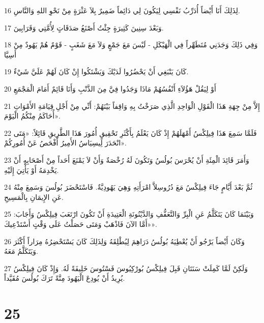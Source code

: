 \par 16 لِذَلِكَ أَنَا أَيْضاً أُدَرِّبُ نَفْسِي لِيَكُونَ لِي دَائِماً ضَمِيرٌ بِلاَ عَثْرَةٍ مِنْ نَحْوِ اللهِ وَالنَّاسِ.
\par 17 وَبَعْدَ سِنِينَ كَثِيرَةٍ جِئْتُ أَصْنَعُ صَدَقَاتٍ لِأُمَّتِي وَقَرَابِينَ.
\par 18 وَفِي ذَلِكَ وَجَدَنِي مُتَطَهِّراً فِي الْهَيْكَلِ - لَيْسَ مَعَ جَمْعٍ وَلاَ مَعَ شَغَبٍ - قَوْمٌ هُمْ يَهُودٌ مِنْ أَسِيَّا
\par 19 كَانَ يَنْبَغِي أَنْ يَحْضُرُوا لَدَيْكَ وَيَشْتَكُوا إِنْ كَانَ لَهُمْ عَلَيَّ شَيْءٌ.
\par 20 أَوْ لِيَقُلْ هَؤُلاَءِ أَنْفُسُهُمْ مَاذَا وَجَدُوا فِيَّ مِنَ الذَّنْبِ وَأَنَا قَائِمٌ أَمَامَ الْمَجْمَعِ
\par 21 إِلاَّ مِنْ جِهَةِ هَذَا الْقَوْلِ الْوَاحِدِ الَّذِي صَرَخْتُ بِهِ وَاقِفاً بَيْنَهُمْ: أَنِّي مِنْ أَجْلِ قِيَامَةِ الأَمْوَاتِ أُحَاكَمُ مِنْكُمُ الْيَوْمَ».
\par 22 فَلَمَّا سَمِعَ هَذَا فِيلِكْسُ أَمْهَلَهُمْ إِذْ كَانَ يَعْلَمُ بِأَكْثَرِ تَحْقِيقٍ أُمُورَ هَذَا الطَّرِيقِ قَائِلاً: «مَتَى انْحَدَرَ لِيسِيَاسُ الأَمِيرُ أَفْحَصُ عَنْ أُمُورِكُمْ».
\par 23 وَأَمَرَ قَائِدَ الْمِئَةِ أَنْ يُحْرَسَ بُولُسُ وَتَكُونَ لَهُ رُخْصَةٌ وَأَنْ لاَ يَمْنَعَ أَحَداً مِنْ أَصْحَابِهِ أَنْ يَخْدِمَهُ أَوْ يَأْتِيَ إِلَيْهِ.
\par 24 ثُمَّ بَعْدَ أَيَّامٍ جَاءَ فِيلِكْسُ مَعَ دُرُوسِلاَّ امْرَأَتِهِ وَهِيَ يَهُودِيَّةٌ. فَاسْتَحْضَرَ بُولُسَ وَسَمِعَ مِنْهُ عَنِ الإِيمَانِ بِالْمَسِيحِ.
\par 25 وَبَيْنَمَا كَانَ يَتَكَلَّمُ عَنِ الْبِرِّ وَالتَّعَفُّفِ وَالدَّيْنُونَةِ الْعَتِيدَةِ أَنْ تَكُونَ ارْتَعَبَ فِيلِكْسُ وَأَجَابَ: «أَمَّا الآنَ فَاذْهَبْ وَمَتَى حَصَلْتُ عَلَى وَقْتٍ أَسْتَدْعِيكَ».
\par 26 وَكَانَ أَيْضاً يَرْجُو أَنْ يُعْطِيَهُ بُولُسُ دَرَاهِمَ لِيُطْلِقَهُ وَلِذَلِكَ كَانَ يَسْتَحْضِرُهُ مِرَاراً أَكْثَرَ وَيَتَكَلَّمُ مَعَهُ.
\par 27 وَلَكِنْ لَمَّا كَمِلَتْ سَنَتَانِ قَبِلَ فِيلِكْسُ بُورْكِيُوسَ فَسْتُوسَ خَلِيفَةً لَهُ. وَإِذْ كَانَ فِيلِكْسُ يُرِيدُ أَنْ يُودِعَ الْيَهُودَ مِنَّةً تَرَكَ بُولُسَ مُقَيَّداً.

\chapter{25}

